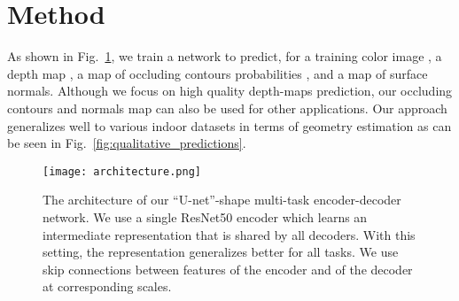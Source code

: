 \documentclass[10pt,twocolumn,letterpaper]{article}
\begin{document}
\section{Method}


\newcommand{\bhC}{\widehat{\boldsymbol{C}}}
\newcommand{\hCi}{\widehat{C}_i}
\newcommand{\bhD}{\widehat{\boldsymbol{D}}}
\newcommand{\hDi}{\widehat{D}_i}
\newcommand{\bhN}{\widehat{\boldsymbol{N}}}
\newcommand{\bhNi}{\widehat{\boldsymbol{N}}_i}

\newcommand{\bC}{\boldsymbol{C}}
\newcommand{\bD}{\boldsymbol{D}}
\newcommand{\bI}{\boldsymbol{I}}
\newcommand{\bN}{\boldsymbol{N}}
\newcommand{\bM}{\boldsymbol{M}}
\newcommand{\bX}{\boldsymbol{X}}
\newcommand{\bn}{\boldsymbol{n}}
\newcommand{\bu}{\boldsymbol{u}}

\newcommand{\calL}{\mathcal{L}}

\newcommand{\normals}{\text{n}}
\newcommand{\depth}{\text{d}}
\newcommand{\boundaries}{\text{c}}
\newcommand{\superv}{\text{superv}}
\newcommand{\dc}{\text{dc}}
\newcommand{\dn}{\text{dn}}
\newcommand{\BerHu}{\text{BerHu}}
\newcommand{\Huber}{\text{Huber}}
\newcommand{\AL}{\text{AL}}

\newcommand{\IR}{\mathbb{R}}

As shown in  Fig.~\ref{fig:architecture}, we train a  network  to
predict,  for a  training  color image  ,  a  depth map  , a map of
occluding contours probabilities , and  a map   of surface normals. 
Although we focus on high quality depth-maps prediction, our occluding 
contours and normals map can also be used for other applications. Our approach 
generalizes well to various indoor datasets in terms of geometry estimation as 
can be seen in Fig.~\ref{fig:qualitative_predictions}.

\begin{figure}[H]
	\begin{center}
\texttt{[image: architecture.png]}
\end{center}
	\caption{The architecture of our ``U-net''-shape \cite{Unet} multi-task 
	encoder-decoder network. We use a single ResNet50 encoder which learns an 
	intermediate representation that is shared by all decoders. With this 
	setting, the representation generalizes better for all tasks. 
		We use skip connections between features of the encoder and of the decoder at corresponding scales.
		}
	\label{fig:architecture}
\end{figure}
\end{document}
